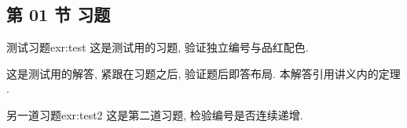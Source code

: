 \subsection{第 01 节 习题}


\begin{exercise}{测试习题}{exr:test}
    这是测试用的习题, 验证独立编号与品红配色.
\end{exercise}

\begin{solution}
    这是测试用的解答, 紧跟在习题之后, 验证题后即答布局. 本解答引用讲义内的定理 .
\end{solution}

\begin{exercise}{另一道习题}{exr:test2}
    这是第二道习题, 检验编号是否连续递增.
\end{exercise}
